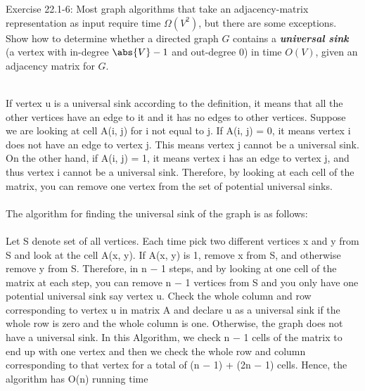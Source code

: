 \documentclass[addpoints,11pt]{exam}
\begin{document}
\begin{questions}
\begin{solutionorbox}
\end{solutionorbox}

\ifprintanswers
\newpage
\else
\bigskip
\fi


\question[5] Exercise 22.1-6: Most graph algorithms that take an adjacency-matrix representation as input require time $\Omega(V^2)$, but there are some exceptions.  Show how to determine whether a directed graph $G$ contains a \textbf{\textit{universal sink}} (a vertex with in-degree $\abs{V}-1$ and out-degree 0) in time $O(V)$, given an adjacency matrix for $G$.
\begin{solutionorbox}
	\\
If vertex u is a universal sink according to the definition, it means that all the other vertices have an edge to it and it has no edges to other vertices.
Suppose we are looking at cell A(i, j) for i not equal to j. If A(i, j) = 0, it means
vertex i does not have an edge to vertex j. This means vertex j cannot be a
universal sink. On the other hand, if A(i, j) = 1, it means vertex i has an edge
to vertex j, and thus vertex i cannot be a universal sink. Therefore, by looking
at each cell of the matrix, you can remove one vertex from the set of potential
universal sinks.\\ \\
The algorithm for finding the universal sink of the graph is as follows:\\ \\
Let S denote set of all vertices. Each time pick two different
vertices x and y from S and look at the cell A(x, y). If A(x, y) is 1, remove
x from S, and otherwise remove y from S. Therefore, in n − 1 steps, and by
looking at one cell of the matrix at each step, you can remove n − 1 vertices
from S and you only have one potential universal sink say vertex u. Check the
whole column and row corresponding to vertex u in matrix A and declare u as a
universal sink if the whole row is zero and the whole column is one. Otherwise,
the graph does not have a universal sink. In this Algorithm, we check n − 1
cells of the matrix to end up with one vertex and then we check the whole row
and column corresponding to that vertex for a total of (n − 1) + (2n − 1) cells.
Hence, the algorithm has O(n) running time

\end{solutionorbox}

\ifprintanswers
\newpage
\else
\bigskip
\fi



\end{questions}
\end{document}
